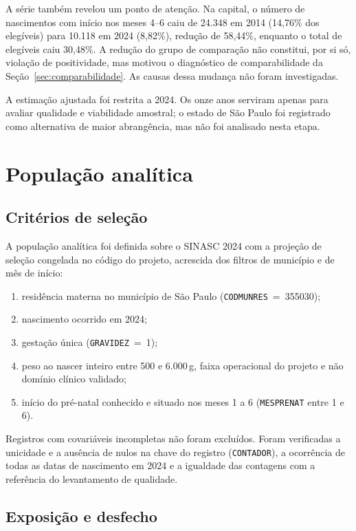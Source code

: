\documentclass[11pt,a4paper]{article}
\newcommand{\campo}[1]{\texttt{#1}}       %
\begin{document}
A série também revelou um ponto de atenção. Na capital, o número de nascimentos com
início nos meses 4--6 caiu de 24.348 em 2014 (14,76\% dos elegíveis) para 10.118 em 2024
(8,82\%), redução de 58,44\%, enquanto o total de elegíveis caiu 30,48\%. A redução do
grupo de comparação não constitui, por si só, violação de positividade, mas motivou o
diagnóstico de comparabilidade da Seção~\ref{sec:comparabilidade}. As causas dessa
mudança não foram investigadas.

A estimação ajustada foi restrita a 2024. Os onze anos serviram apenas para avaliar
qualidade e viabilidade amostral; o estado de São Paulo foi registrado como alternativa
de maior abrangência, mas não foi analisado nesta etapa.

\section{População analítica}\label{sec:populacao}

\subsection{Critérios de seleção}

A população analítica foi definida sobre o SINASC 2024 com a projeção de seleção
congelada no código do projeto, acrescida dos filtros de município e de mês de início:

\begin{enumerate}
\item residência materna no município de São Paulo (\campo{CODMUNRES}~=~355030);
\item nascimento ocorrido em 2024;
\item gestação única (\campo{GRAVIDEZ}~=~1);
\item peso ao nascer inteiro entre 500 e 6.000\,g, faixa operacional do projeto e não
domínio clínico validado;
\item início do pré-natal conhecido e situado nos meses 1 a 6 (\campo{MESPRENAT} entre 1
e 6).
\end{enumerate}

Registros com covariáveis incompletas não foram excluídos. Foram verificadas a unicidade
e a ausência de nulos na chave do registro (\campo{CONTADOR}), a ocorrência de todas as
datas de nascimento em 2024 e a igualdade das contagens com a referência do levantamento
de qualidade.

\subsection{Exposição e desfecho}
\end{document}
